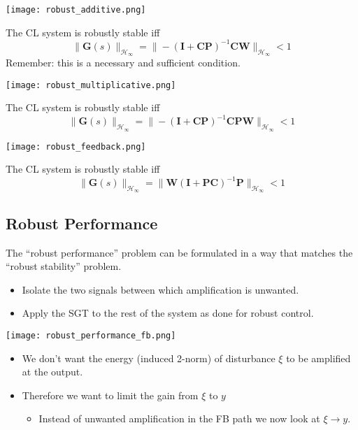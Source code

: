 \begin{center}
    \texttt{[image: robust\_additive.png]}
\end{center}
The CL system is robustly stable iff
\begin{equation*}
    \|\mathbf{G}(s)\|_{\mathcal{H}_\infty}=\|-{(\mathbf{I}+\mathbf{C}\mathbf{P})}^{-1}\mathbf{C}\mathbf{W}\|_{\mathcal{H}_\infty}<1
\end{equation*}
Remember: this is a necessary and sufficient condition.

\begin{center}
    \texttt{[image: robust\_multiplicative.png]}
\end{center}
The CL system is robustly stable iff
\begin{equation*}
    \|\mathbf{G}(s)\|_{\mathcal{H}_\infty}=\|-{(\mathbf{I}+\mathbf{CP})}^{-1}\mathbf{CPW}\|_{\mathcal{H}_\infty}<1
\end{equation*}

\begin{center}
    \texttt{[image: robust\_feedback.png]}
\end{center}
The CL system is robustly stable iff
\begin{equation*}
    \|\mathbf{G}(s)\|_{\mathcal{H}_\infty}=\|\mathbf{W}{(\mathbf{I}+\mathbf{PC})}^{-1}\mathbf{P}\|_{\mathcal{H}_\infty}<1
\end{equation*}

\subsection{Robust Performance}
The “robust performance” problem can be formulated in a way that matches the “robust stability” problem.
\begin{itemize}
    \item Isolate the two signals between which amplification is unwanted.
    \item Apply the SGT to the rest of the system as done for robust control.
\end{itemize}


\begin{center}
    \texttt{[image: robust\_performance\_fb.png]}
\end{center}
\begin{itemize}
    \item We don't want the energy (induced 2-norm) of disturbance $\xi$ to be amplified at the output.
    \item Therefore we want to limit the gain from $\xi$ to $y$
          \begin{itemize}
              \item Instead of unwanted amplification in the FB path we now look at $\xi \rightarrow y$.
          \end{itemize}
\end{itemize}

